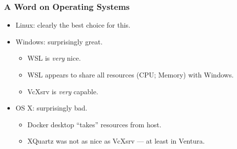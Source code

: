     \begin{frame}
      \frametitle{A Word on Operating Systems}
      \begin{itemize}
      \item<2-> Linux: clearly the best choice for this.
      \item<3-> Windows: surprisingly great.
        \begin{itemize}
        \item<4-> WSL is \textit{very} nice.
        \item<5-> WSL appears to share all resources (CPU; Memory) with Windows.
        \item<6-> VcXsrv is \textit{very} capable.
        \end{itemize}
      \item<7-> OS X: surprisingly bad.
        \begin{itemize}
        \item<8-> Docker desktop ``takes'' resources from host.
        \item<9-> XQuartz was not as nice as VcXsrv --- at least in Ventura.
        \end{itemize}
      \end{itemize}
    \end{frame}

